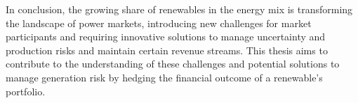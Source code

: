   In conclusion, the growing share of renewables in the energy mix is transforming the landscape of power markets,
  introducing new challenges for market participants and requiring innovative solutions to manage uncertainty and
  production risks and maintain certain revenue streams.
  This thesis aims to contribute to the understanding of these challenges and potential solutions
  to manage generation risk by hedging the financial outcome of a renewable's portfolio.

